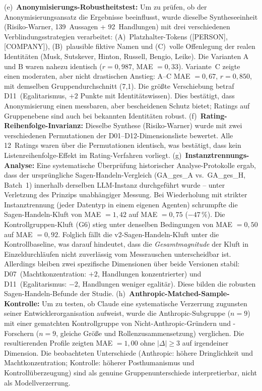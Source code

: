 \documentclass[12pt,a4paper]{article}
\begin{document}
(e)~\textbf{Anonymisierungs-Robustheitstest:} Um zu pr\"ufen, ob der Anonymisierungsansatz die Ergebnisse beeinflusst, wurde dieselbe Syntheseeinheit (Risiko-Warner, 139~Aussagen + 92~Handlungen) mit drei verschiedenen Verblindungsstrategien verarbeitet: (A)~Platzhalter-Tokens ([PERSON], [COMPANY]), (B)~plausible fiktive Namen und (C)~volle Offenlegung der realen Identit\"aten (Musk, Sutskever, Hinton, Russell, Bengio, Leike). Die Varianten A und B waren nahezu identisch ($r = 0{,}987$, MAE $= 0{,}33$). Variante~C zeigte einen moderaten, aber nicht drastischen Anstieg: A--C MAE $= 0{,}67$, $r = 0{,}850$, mit demselben Gruppendurchschnitt (7,1). Die gr\"o\ss{}te Verschiebung betraf D11~(Egalitarismus, $+2$ Punkte mit Identit\"atswissen). Dies best\"atigt, dass Anonymisierung einen messbaren, aber bescheidenen Schutz bietet; Ratings auf Gruppenebene sind auch bei bekannten Identit\"aten robust.
(f)~\textbf{Rating-Reihenfolge-Invarianz:} Dieselbe Synthese (Risiko-Warner) wurde mit zwei verschiedenen Permutationen der D01--D12-Dimensionsliste bewertet. Alle 12~Ratings waren \"uber die Permutationen identisch, was best\"atigt, dass kein Listenreihenfolge-Effekt im Rating-Verfahren vorliegt.
(g)~\textbf{Instanztrennungs-Analyse:} Eine systematische \"Uberpr\"ufung historischer Analyse-Protokolle ergab, dass der urspr\"ungliche Sagen-Handeln-Vergleich (GA\_ges\_A vs.\ GA\_ges\_H, Batch~1) innerhalb derselben LLM-Instanz durchgef\"uhrt wurde -- unter Verletzung des Prinzips unabh\"angiger Messung. Bei Wiederholung mit strikter Instanztrennung (jeder Datentyp in einem eigenen Agenten) schrumpfte die Sagen-Handeln-Kluft von MAE $= 1{,}42$ auf MAE $= 0{,}75$ ($-47\,\%$). Die Kontrollgruppen-Kluft (G6) stieg unter denselben Bedingungen von MAE $= 0{,}50$ auf MAE $= 0{,}92$. Folglich f\"allt die v2-Sagen-Handeln-Kluft unter die Kontrollbaseline, was darauf hindeutet, dass die \emph{Gesamtmagnitude} der Kluft in Einzeldurchl\"aufen nicht zuverl\"assig vom Messrauschen unterscheidbar ist. Allerdings bleiben zwei spezifische Dimensionen \"uber beide Versionen stabil: D07~(Machtkonzentration: $+2$, Handlungen konzentrierter) und D11~(Egalitarismus: $-2$, Handlungen weniger egalit\"ar). Diese bilden die robusten Sagen-Handeln-Befunde der Studie.
(h)~\textbf{Anthropic-Matched-Sample-Kontrolle:} Um zu testen, ob Claude eine systematische Verzerrung zugunsten seiner Entwicklerorganisation aufweist, wurde die Anthropic-Subgruppe ($n = 9$) mit einer gematchten Kontrollgruppe von Nicht-Anthropic-Gr\"undern und -Forschern ($n = 9$, gleiche Gr\"o\ss{}e und Rollenzusammensetzung) verglichen. Die resultierenden Profile zeigten MAE $= 1{,}00$ ohne $|\Delta| \geq 3$ auf irgendeiner Dimension. Die beobachteten Unterschiede (Anthropic: h\"ohere Dringlichkeit und Machtkonzentration; Kontrolle: h\"oherer Posthumanismus und Kontroll\"uberzeugung) sind als genuine Gruppenunterschiede interpretierbar, nicht als Modellverzerrung.
\end{document}
